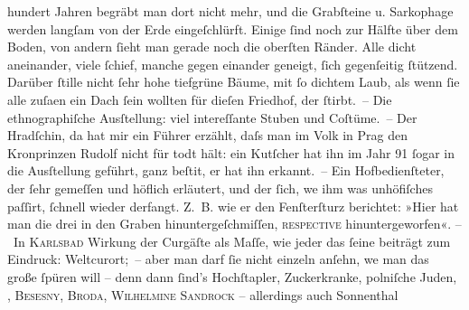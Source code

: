 \begin{ledgroupsized}[t]{13cm}
                    hundert Jahren begräbt man dort nicht mehr, und die Grabſteine u. Sarkophage
                    werden langſam von der Erde eingeſchlürft. Einige ſind noch zur Hälfte über dem
                    Boden, von andern ſieht man gerade noch die oberſten Ränder. Alle dicht
                    aneinander, viele ſchief, manche gegen einander geneigt, ſich gegenſeitig {\pb}ſtützend. Darüber ſtille nicht ſehr hohe
                    tiefgrüne Bäume, mit ſo dichtem Laub, als wenn ſie alle zuſa{\geminationm}en ein Dach ſein wollten für dieſen Friedhof, der ſtirbt. – Die ethnographiſche Ausſtellung: viel intereſſante
                    Stuben und Coſtüme. – Der Hradſchin, da
                    hat mir ein Führer erzählt, daſs man im Volk in Prag den Kronprinzen Rudolf
                    nicht für todt hält: ein Kutſcher hat ihn im Jahr 91{ }ſogar in die
                    Ausſtellung geführt, ganz beſti{\geminationm}t, er hat ihn
                    erkannt. – Ein Hofbedienſteter, der ſehr gemeſſen und höflich erläutert, und der
                    ſich, we{\geminationn} ihm was unhöfiſches paſſirt, ſchnell
                    wieder derfangt. Z. B. {\pb}wie er den Fenſterſturz
                    berichtet: »Hier hat man die drei in den Graben hinuntergeſchmiſſen, \textsc{reſpective} hinuntergeworfen«.\pend
           \pstart
           – In \textsc{Karlsbad} Wirkung der Curgäſte als Maſſe, wie jeder das ſeine beiträgt zum
                    Eindruck: Weltcurort; – aber man darf ſie nicht einzeln anſehn, we{\geminationn} man das große ſpüren will – denn dann ſind’s
                    Hochſtapler, Zuckerkranke, polniſche Juden, \label{K_L00462_1v}\label{K_L00462_1h}, \textsc{Besesny}, \textsc{Broda}, \textsc{Wilhelmine Sandrock} – allerdings auch Sonnenthal

\end{ledgroupsized}
